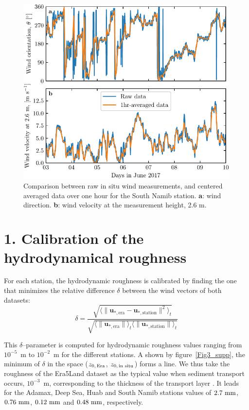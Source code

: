 \begin{figure}
  \centering
  \includegraphics[scale=1]{Figures/Figure2_supp.pdf}
  \caption{Comparison between raw in situ wind measurements, and centered averaged data over one hour for the South Namib station. \textbf{a}: wind direction. \textbf{b}: wind velocity at the measurement height, 2.6 m.}
  \label{Fig2_supp}
\end{figure}

\section*{1. Calibration of the hydrodynamical roughness}

For each station, the hydrodynamic roughness is calibrated by finding the one that minimizes the relative difference $\delta$ between the wind vectors of both datasets:
\begin{equation}
  \label{metric_roughness}
      \delta = \frac{\sqrt{\langle\| \boldsymbol{u}_{*, \textrm{era}} - \boldsymbol{u}_{*, \textrm{station}} \|^{2}\rangle_{t}}}{\sqrt{ \langle \| \boldsymbol{u}_{*, \textrm{era}} \| \rangle_{t}\langle \| \boldsymbol{u}_{*, \textrm{station}} \| \rangle_{t}}}
\end{equation}



This $\delta$--parameter is computed for hydrodynamic roughness values ranging from $10^{-5}$~m to $10^{-2}$~m for the different stations. A shown by figure~\ref{Fig3_supp}, the minimum of $\delta$ in the space ($z_{0,\, \textup{Era}}$, $z_{0,\, \textup{in situ}}$) forms a line. We thus take the roughness of the Era5Land dataset as the typical value when sediment transport occurs, $10^{-3}$~m, corresponding to the thickness of the transport layer \citep{Sherman2007}. It leads for the Adamax, Deep Sea, Huab and South Namib stations values of $2.7~\textup{mm}$, $0.76~\textup{mm}$, $0.12~\textup{mm}$ and $0.48~\textup{mm}$, respectively.

